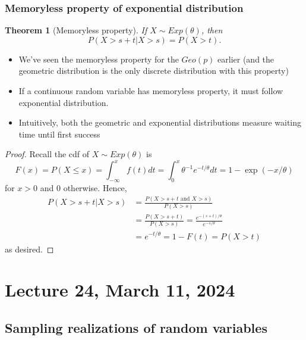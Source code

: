 \documentclass[
]{book}
\providecommand{\tightlist}{%
  \setlength{\itemsep}{0pt}\setlength{\parskip}{0pt}}
\newtheorem{theorem}{Theorem}[chapter]
\theoremstyle{definition}
\theoremstyle{definition}
\theoremstyle{definition}
\theoremstyle{definition}
\theoremstyle{remark}
\begin{document}
\subsection{Memoryless property of exponential distribution}\label{memoryless-property-of-exponential-distribution}

\begin{theorem}[Memoryless property]
If \(X \sim Exp(\theta)\), then
\[
        P(X > s + t | X > s) = P(X > t).
        \]
\end{theorem}

\begin{itemize}
\tightlist
\item
  We've seen the memoryless property for the \(Geo(p)\) earlier (and the geometric distribution is the only discrete distribution with this property)
\item
  If a continuous random variable has memoryless property, it must follow exponential distribution.
\item
  Intuitively, both the geometric and exponential distributions measure waiting time until first success
\end{itemize}

\begin{proof}
Recall the cdf of \(X\sim Exp(\theta)\) is
\[ F(x)=P(X\leq x) =\int_{-\infty}^x f(t)dt = \int_0^x \theta^{-1} e^{-t/\theta}dt = 1-\exp(-x/\theta)\]
for \(x>0\) and 0 otherwise. Hence,
\begin{align*}
       P(X > s + t | X > s) &= \frac{P( X>s+t \text{ and }X>s)}{P(X>s)}\\
       &= \frac{P(X>s+t)}{P(X>s)} = \frac{e^{-(s+t)/\theta}}{e^{-s/\theta}}\\
       &= e^{-t/\theta} = 1-F(t) = P(X>t)
   \end{align*}
as desired.
\end{proof}

\chapter{Lecture 24, March 11, 2024}\label{lecture-24-march-11-2024}

\newcommand{\var}{\mathbb{V}ar}
\newcommand{\R}{\mathbb{R}}
\newcommand{\E}{\mathbb{E}}

\section{Sampling realizations of random variables}\label{sampling-realizations-of-random-variables}
\end{document}

